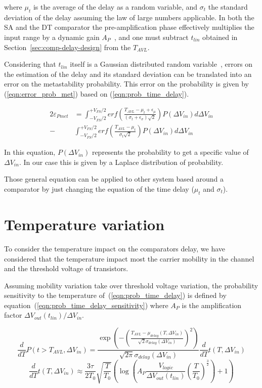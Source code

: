 where $\mu_{t}$ is the average of the delay as a random variable, and $\sigma_{t}$ the standard deviation of the delay assuming the law of large numbers applicable. In both the SA and the DT comparator the pre-amplification phase effectively multiplies the input range by a dynamic gain $A_{P}$~\cite{metastability_figueiredo_2013}, and one must subtract $t_{lin}$ obtained in Section~\ref{sec:comp-delay-design} from the $T_{AVL}$.

Considering that $t_{lin}$  itself is a Gaussian distributed random variable~\cite{metastability_figueiredo_2013}, errors on the estimation of the delay and its standard deviation can be translated into an error on the metastability probability. This error on the probability is given by (\ref{eqn:error_prob_met}) based on (\ref{eqn:prob_time_delay}).


\begin{align}
2\varepsilon_{Pmet}& = \int_{-V_{FS}/2}^{+V_{FS}/2}{erf\left(\frac{T_{AVL}-\mu_{t}+\epsilon_{\mu}}{(\sigma_{t}+\epsilon_{\sigma})\sqrt{2}}\right)P(\Delta V_{in})d\Delta V_{in}} \nonumber \\
- &\int_{-V_{FS}/2}^{+V_{FS}/2}{erf\left(\frac{T_{AVL}-\mu_{t}}{\sigma_{t}\sqrt{2}}\right)P(\Delta V_{in})d\Delta V_{in}}
\label{eqn:error_prob_met}
\end{align}

In this equation, $P(\Delta V_{in})$ represents the probability to get a specific value of $\Delta V_{in}$. In our case this is given by a Laplace distribution of probability.

Those general equation can be applied to other system based around a comparator by just changing the equation of the time delay ($\mu_{t}$ and $\sigma_{t}$).

\section{Temperature variation}
To consider the temperature impact on the comparators delay, we have considered that the temperature impact most the carrier mobility in the channel and the threshold voltage of transistors.

Assuming mobility variation take over threshold voltage variation, the probability sensitivity to the temperature of~(\ref{eqn:prob_time_delay}) is defined by equation~(\ref{eqn:prob_time_delay_sensitivity}) where $A_P$ is the amplification factor $\Delta V_{out}(t_{lin}) /\Delta V_{in}$.  

\begin{equation}
\frac{d}{dT}P(t > T_{AVL}, \Delta V_{in}) = 
\frac{\exp\left(-{\left(\frac{T_{AVL}-\mu_{delay}(T, \Delta V_{in})}{\sqrt{2}\sigma_{delay}(\Delta V_{in})}\right)}^2 \right)}{\sqrt{2\pi}\sigma_{delay}(\Delta V_{in})} \frac{d}{dT}t(T, \Delta V_{in})
\label{eqn:prob_time_delay_sensitivity}
\end{equation}
\begin{equation}
\frac{d}{dT}t(T, \Delta V_{in}) \approx 
\frac{3\tau}{2 T_0} \sqrt{\frac{T}{T_0}}\left(\log\left(A_P \frac{V_{logic}}{\Delta V_{out}(t_{lin})} {\left(\frac{T}{T_0}\right)}^\frac{3}{2}\right)+1\right)
\label{eqn:time_delay_sensitivity}
\end{equation}

